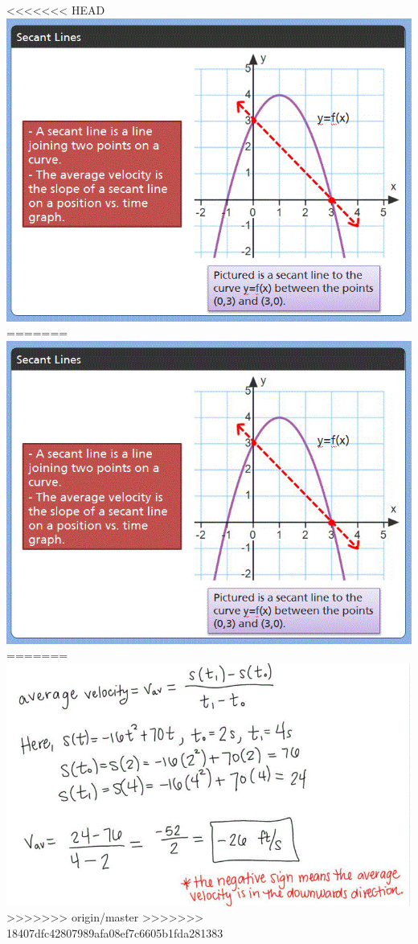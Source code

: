 \documentclass{ximera}
\begin{document}
\begin{image}
<<<<<<< HEAD
\includegraphics{picture5.gif}
=======
\includegraphics{picture5.jpg}
=======
\includegraphics{picture2.jpg}
>>>>>>> origin/master
>>>>>>> 18407dfc42807989afa08ef7c6605b1fda281383
\end{image}
\end{document}
